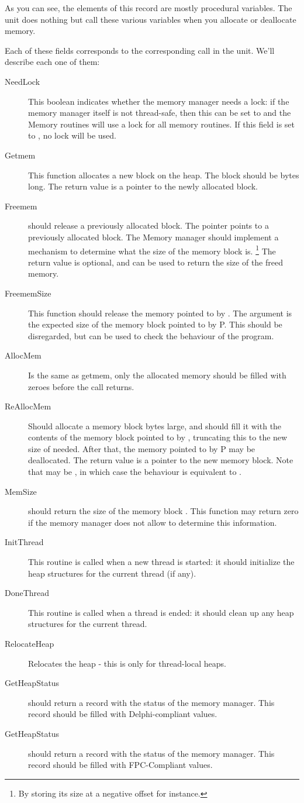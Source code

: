 As you can see, the elements of this record are mostly procedural variables.
The  unit does nothing but call these various variables when you
allocate or deallocate memory.

Each of these fields corresponds to the corresponding call in the 
unit. We'll describe each one of them:
\begin{description}
\item[NeedLock] This boolean indicates whether the memory manager needs a lock:
if the memory manager itself is not thread-safe, then this can be set to
 and the Memory routines will use a lock for all memory routines. 
If this field is set to , no lock will be used.
\item[Getmem] This function allocates a new block on the heap. The block
should be  bytes long. The return value is a pointer to the newly
allocated block.
\item[Freemem] should release a previously allocated block. The pointer
 points to a previously allocated block. The Memory manager should
implement a mechanism to determine what the size of the memory block is.
\footnote{By storing its size at a negative offset for instance.} The
return value is optional, and can be used to return the size of the freed
memory.
\item[FreememSize] This function should release the memory pointed to by
. The argument  is the expected size of the memory block
pointed to by P. This should be disregarded, but can be used to check the
behaviour of the program.
\item[AllocMem] Is the same as getmem, only the allocated memory should
be filled with zeroes before the call returns.
\item[ReAllocMem] Should allocate a memory block  bytes large,
and should fill it with the contents of the memory block pointed to by
, truncating this to the new size of needed. After that, the memory
pointed to by P may be deallocated. The return value is a pointer to the
new memory block. Note that  may be , in which case the
behaviour is equivalent to .
\item[MemSize] should return the size of the memory block .
This function may return zero if the memory manager does not allow 
to determine this information.
\item[InitThread] This routine is called when a new thread is started:
it should initialize the heap structures for the current thread (if any).
\item[DoneThread] This routine is called when a thread is ended:
it should clean up any heap structures for the current thread.
\item[RelocateHeap] Relocates the heap - this is only for thread-local
heaps.
\item[GetHeapStatus] should return a  record with the
status of the memory manager. This record should be filled with
Delphi-compliant values.
\item[GetHeapStatus] should return a  record with the
status of the memory manager. This record should be filled with
FPC-Compliant values.
\end{description}
